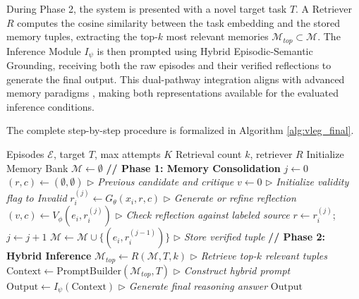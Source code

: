 \documentclass[onecolumn]{IEEEtran}
\numberwithin{equation}{section}
\theoremstyle{definition}
\theoremstyle{remark}
\begin{document}
During Phase 2, the system is presented with a novel target task $T$. A Retriever $R$ computes the cosine similarity between the task embedding and the stored memory tuples, extracting the top-$k$ most relevant memories $\mathcal{M}_{top} \subset \mathcal{M}$. The Inference Module $I_\psi$ is then prompted using Hybrid Episodic-Semantic Grounding, receiving both the raw episodes and their verified reflections to generate the final output. This dual-pathway integration aligns with advanced memory paradigms \cite{wu2025from}, making both representations available for the evaluated inference conditions.

The complete step-by-step procedure is formalized in Algorithm \ref{alg:vleg_final}.

\noindent\begin{minipage}{0.48\textwidth}
\begin{algorithm}[H]
\caption{Verified Localized Episodic Grounding (VLEG)}
\label{alg:vleg_final}
\small
\begin{algorithmic}[1]
\Require Episodes $\mathcal{E}$, target $T$, max attempts $K$
\Statex Retrieval count $k$, retriever $R$
\State Initialize Memory Bank $\mathcal{M} \gets \emptyset$
\State \textbf{// Phase 1: Memory Consolidation}
    \State $j \gets 0$
    \State $(r,c) \gets (\emptyset,\emptyset)$
        \Statex $\triangleright$ \textit{Previous candidate and critique}
    \State $v \gets 0$
        \Statex $\triangleright$ \textit{Initialize validity flag to Invalid}
        \State $r_i^{(j)} \gets G_\theta(x_i, r, c)$
        \Statex $\triangleright$ \textit{Generate or refine reflection}
        \State $(v, c) \gets V_\phi(e_i, r_i^{(j)})$
        \Statex $\triangleright$ \textit{Check reflection against labeled source}
        \State $r \gets r_i^{(j)}$; $j \gets j + 1$
    \EndWhile
        \State $\mathcal{M} \gets \mathcal{M} \cup \{(e_i, r_i^{(j-1)})\}$
        \Statex $\triangleright$ \textit{Store verified tuple}
    \EndIf
\EndFor
\State \textbf{// Phase 2: Hybrid Inference}
\State $\mathcal{M}_{top} \gets R(\mathcal{M}, T, k)$
        \Statex $\triangleright$ \textit{Retrieve top-$k$ relevant tuples}
\State $\text{Context} \gets \text{PromptBuilder}(\mathcal{M}_{top},T)$
        \Statex $\triangleright$ \textit{Construct hybrid prompt}
\State $\text{Output} \gets I_\psi(\text{Context})$
        \Statex $\triangleright$ \textit{Generate final reasoning answer}
\State \Return $\text{Output}$
\end{algorithmic}
\end{algorithm}
\end{minipage}
\end{document}
